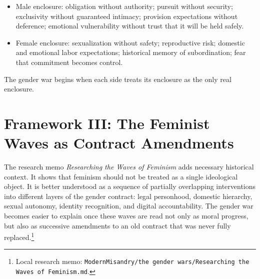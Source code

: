 \documentclass[12pt]{article}
\newcommand{\WavesResearch}{\textit{Researching the Waves of Feminism}}
\newcommand{\SourceNote}[1]{\footnote{#1}}
\begin{document}
\begin{itemize}
  \item Male enclosure: obligation without authority; pursuit without security; exclusivity without guaranteed intimacy; provision expectations without deference; emotional vulnerability without trust that it will be held safely.
  \item Female enclosure: sexualization without safety; reproductive risk; domestic and emotional labor expectations; historical memory of subordination; fear that commitment becomes control.
\end{itemize}

The gender war begins when each side treats its enclosure as the only real enclosure.

\section{Framework III: The Feminist Waves as Contract Amendments}

The research memo \WavesResearch{} adds necessary historical context. It shows that feminism should not be treated as a single ideological object. It is better understood as a sequence of partially overlapping interventions into different layers of the gender contract: legal personhood, domestic hierarchy, sexual autonomy, identity recognition, and digital accountability. The gender war becomes easier to explain once these waves are read not only as moral progress, but also as successive amendments to an old contract that was never fully replaced.\SourceNote{Local research memo: \texttt{ModernMisandry/the gender wars/Researching the Waves of Feminism.md}.}
\end{document}
